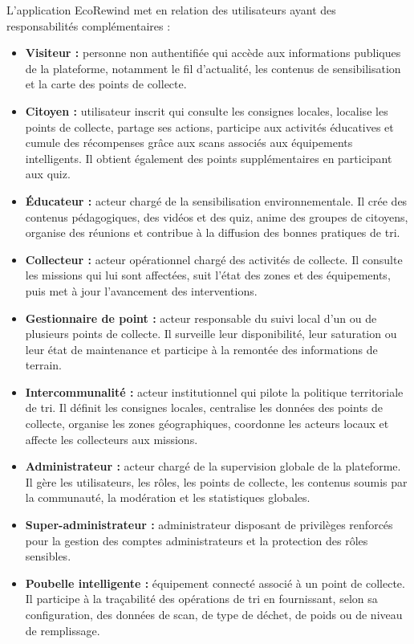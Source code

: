 L'application EcoRewind met en relation des utilisateurs ayant des responsabilités complémentaires :
\begin{itemize}
    \item \textbf{Visiteur :} personne non authentifiée qui accède aux informations publiques de la plateforme, notamment le fil d'actualité, les contenus de sensibilisation et la carte des points de collecte.
    \item \textbf{Citoyen :} utilisateur inscrit qui consulte les consignes locales, localise les points de collecte, partage ses actions, participe aux activités éducatives et cumule des récompenses grâce aux scans associés aux équipements intelligents. Il obtient également des points supplémentaires en participant aux quiz.
    \item \textbf{Éducateur :} acteur chargé de la sensibilisation environnementale. Il crée des contenus pédagogiques, des vidéos et des quiz, anime des groupes de citoyens, organise des réunions et contribue à la diffusion des bonnes pratiques de tri.
    \item \textbf{Collecteur :} acteur opérationnel chargé des activités de collecte. Il consulte les missions qui lui sont affectées, suit l'état des zones et des équipements, puis met à jour l'avancement des interventions.
    \item \textbf{Gestionnaire de point :} acteur responsable du suivi local d'un ou de plusieurs points de collecte. Il surveille leur disponibilité, leur saturation ou leur état de maintenance et participe à la remontée des informations de terrain.
    \item \textbf{Intercommunalité :} acteur institutionnel qui pilote la politique territoriale de tri. Il définit les consignes locales, centralise les données des points de collecte, organise les zones géographiques, coordonne les acteurs locaux et affecte les collecteurs aux missions.
    \item \textbf{Administrateur :} acteur chargé de la supervision globale de la plateforme. Il gère les utilisateurs, les rôles, les points de collecte, les contenus soumis par la communauté, la modération et les statistiques globales.
    \item \textbf{Super-administrateur :} administrateur disposant de privilèges renforcés pour la gestion des comptes administrateurs et la protection des rôles sensibles.
    \item \textbf{Poubelle intelligente :} équipement connecté associé à un point de collecte. Il participe à la traçabilité des opérations de tri en fournissant, selon sa configuration, des données de scan, de type de déchet, de poids ou de niveau de remplissage.
\end{itemize}

